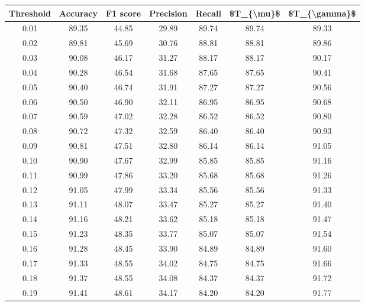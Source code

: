 \begin{tabular}{|c|c|c|c|c|c|c|}
\hline
 Threshold &  Accuracy &  F1 score &  Precision &  Recall &  \$T\_\{\textbackslash mu\}\$ &  \$T\_\{\textbackslash gamma\}\$ \\
\hline
      0.01 &     89.35 &     44.85 &      29.89 &   89.74 &      89.74 &         89.33 \\
      0.02 &     89.81 &     45.69 &      30.76 &   88.81 &      88.81 &         89.86 \\
      0.03 &     90.08 &     46.17 &      31.27 &   88.17 &      88.17 &         90.17 \\
      0.04 &     90.28 &     46.54 &      31.68 &   87.65 &      87.65 &         90.41 \\
      0.05 &     90.40 &     46.74 &      31.91 &   87.27 &      87.27 &         90.56 \\
      0.06 &     90.50 &     46.90 &      32.11 &   86.95 &      86.95 &         90.68 \\
      0.07 &     90.59 &     47.02 &      32.28 &   86.52 &      86.52 &         90.80 \\
      0.08 &     90.72 &     47.32 &      32.59 &   86.40 &      86.40 &         90.93 \\
      0.09 &     90.81 &     47.51 &      32.80 &   86.14 &      86.14 &         91.05 \\
      0.10 &     90.90 &     47.67 &      32.99 &   85.85 &      85.85 &         91.16 \\
      0.11 &     90.99 &     47.86 &      33.20 &   85.68 &      85.68 &         91.26 \\
      0.12 &     91.05 &     47.99 &      33.34 &   85.56 &      85.56 &         91.33 \\
      0.13 &     91.11 &     48.07 &      33.47 &   85.27 &      85.27 &         91.40 \\
      0.14 &     91.16 &     48.21 &      33.62 &   85.18 &      85.18 &         91.47 \\
      0.15 &     91.23 &     48.35 &      33.77 &   85.07 &      85.07 &         91.54 \\
      0.16 &     91.28 &     48.45 &      33.90 &   84.89 &      84.89 &         91.60 \\
      0.17 &     91.33 &     48.55 &      34.02 &   84.75 &      84.75 &         91.66 \\
      0.18 &     91.37 &     48.55 &      34.08 &   84.37 &      84.37 &         91.72 \\
      0.19 &     91.41 &     48.61 &      34.17 &   84.20 &      84.20 &         91.77 \\

\end{tabular}

